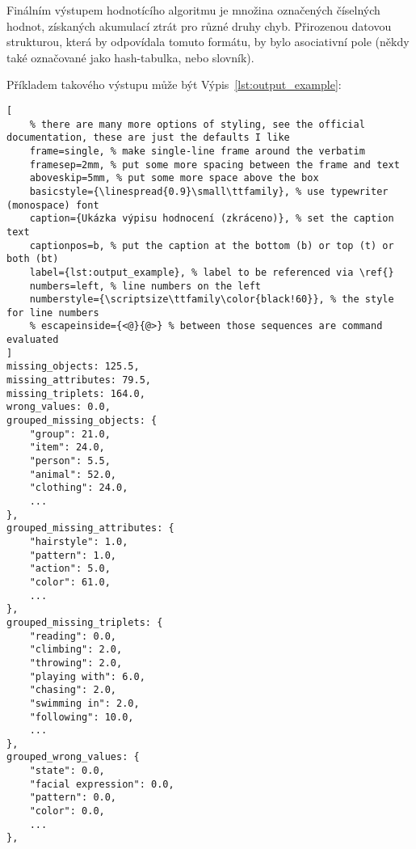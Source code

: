 Finálním výstupem hodnotícího algoritmu je množina označených číselných hodnot, získaných akumulací ztrát pro různé druhy chyb.
Přirozenou datovou strukturou, která by odpovídala tomuto formátu, by bylo asociativní pole (někdy také označované jako hash-tabulka, nebo slovník).

Příkladem takového výstupu může být Výpis~\ref{lst:output_example}:
\begin{lstlisting}[
	% there are many more options of styling, see the official documentation, these are just the defaults I like
	frame=single, % make single-line frame around the verbatim
	framesep=2mm, % put some more spacing between the frame and text
	aboveskip=5mm, % put some more space above the box
	basicstyle={\linespread{0.9}\small\ttfamily}, % use typewriter (monospace) font
	caption={Ukázka výpisu hodnocení (zkráceno)}, % set the caption text
	captionpos=b, % put the caption at the bottom (b) or top (t) or both (bt)
	label={lst:output_example}, % label to be referenced via \ref{}
	numbers=left, % line numbers on the left
	numberstyle={\scriptsize\ttfamily\color{black!60}}, % the style for line numbers
	% escapeinside={<@}{@>} % between those sequences are command evaluated
]
missing_objects: 125.5,
missing_attributes: 79.5,
missing_triplets: 164.0,
wrong_values: 0.0,
grouped_missing_objects: {
    "group": 21.0,
    "item": 24.0,
    "person": 5.5,
    "animal": 52.0,
    "clothing": 24.0,
    ...
},
grouped_missing_attributes: {
    "hairstyle": 1.0,
    "pattern": 1.0,
    "action": 5.0,
    "color": 61.0,
    ...
},
grouped_missing_triplets: {
    "reading": 0.0,
    "climbing": 2.0,
    "throwing": 2.0,
    "playing with": 6.0,
    "chasing": 2.0,
    "swimming in": 2.0,
    "following": 10.0,
    ...
},
grouped_wrong_values: {
    "state": 0.0,
    "facial expression": 0.0,
    "pattern": 0.0,
    "color": 0.0,
    ...
},
\end{lstlisting}
